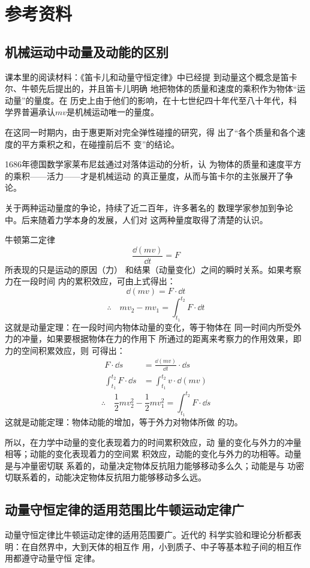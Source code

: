 \section{参考资料}
\subsection{机械运动中动量及动能的区别}

课本里的阅读材料：《笛卡儿和动量守恒定律》中已经提
到动量这个概念是笛卡尔、牛顿先后提出的，并且笛卡儿明确
地把物体的质量和速度的乘积作为物体“运动量”的量度。在
历史上由于他们的影响，在十七世纪四十年代至八十年代，科
学界普遍承认$mv$是机械运动唯一的量度。

在这同一时期内，由于惠更斯对完全弹性碰撞的研究，得
出了“各个质量和各个速度的平方乘积之和，在碰撞前后不
变”的结论。

1686年德国数学家莱布尼兹通过对落体运动的分析，认
为物体的质量和速度平方的乘积——活力——才是机械运动
的真正量度，从而与笛卡尔的主张展开了争论。

关于两种运动量度的争论，持续了近二百年，许多著名的
数理学家参加到争论中。后来随着力学本身的发展，人们对
这两种量度取得了清楚的认识。

牛顿第二定律
\[\frac{\dd(mv)}{\dd t}=F\]
所表现的只是运动的原因（力）
和结果（动量变化）之间的瞬时关系。如果考察力在一段时间
内的累积效应，可由上式得出：
\[\dd(mv)=F\cdot \dd t\]
\[\therefore\quad mv_2-mv_1=\int^{t_2}_{t_1}F\cdot \dd t\]
这就是动量定理：在一段时间内物体动量的变化，等于物体在
同一时间内所受外力的冲量，如果要根据物体在力的作用下
所通过的距离来考察力的作用效果，即力的空间积累效应，则
可得出：
\[\begin{split}
    F\cdot \dd s&=\frac{\dd(mv)}{\dd t}\cdot \dd s\\
    \int^{t_2}_{t_1}F\cdot \dd s&=\int^{t_2}_{t_1}v\cdot \dd (mv)
\end{split}\]
\[\therefore\quad \frac{1}{2}mv^2_2-\frac{1}{2}mv^2_1=\int^{t_2}_{t_1}F\cdot \dd s\]
这就是动能定理：物体动能的增加，等于外力对物体所做
的功。

所以，在力学中动量的变化表现着力的时间累积效应，动
量的变化与外力的冲量相等；动能的变化表现着力的空间累
积效应，动能的变化与外力的功相等。动量是与冲量密切联
系着的，动量决定物体反抗阻力能够移动多么久；动能是与
功密切联系着的，动能决定物体反抗阻力能够移动多么远。


\subsection{动量守恒定律的适用范围比牛顿运动定律广}
动量守恒定律比牛顿运动定律的适用范围要广。近代的
科学实验和理论分析都表明：在自然界中，大到天体的相互作
用，小到质子、中子等基本粒子间的相互作用都遵守动量守恒
定律。


